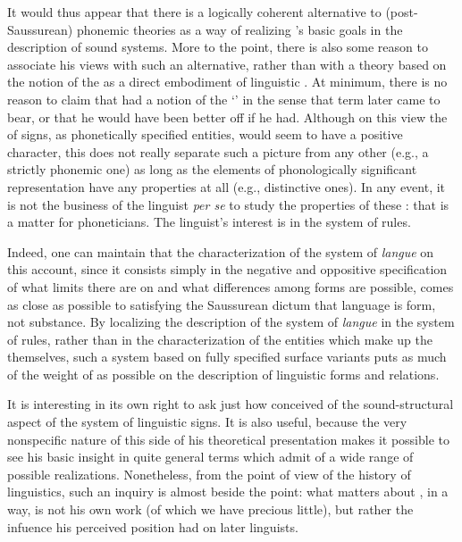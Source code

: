 It would thus appear that there is a logically coherent alternative to
(post-Saussurean) phonemic theories as a way of realizing {\Saussure}'s
basic goals in the description of sound systems. More to the point,
there is also some reason to associate his views with such an
alternative, rather than with a theory based on the notion of the
 as a direct embodiment of linguistic . At minimum,
there is no reason to claim that {\Saussure} had a notion of the
`' in the sense that term later came to bear, or that he would
have been better off if he had. Although on this view the
\emph{} of signs, as phonetically specified entities, would
seem to have a positive character, this does not really separate such
a picture from any other (e.g., a strictly phonemic one) as long as
the elements of phonologically significant representation have any
properties at all (e.g., distinctive ones). In any event, it is not
the business of the linguist \emph{per se} to study the properties of
these : that is a matter for phoneticians. The
linguist's interest is in the system of {rules}.

Indeed, one can maintain that the characterization of the system of
\emph{langue} on this account, since it consists simply in the
negative and oppositive specification of what limits there are on
 and what differences among forms are possible, comes as
close as possible to satisfying the Saussurean dictum that language is
form, not substance. By localizing the description of the system of
\emph{langue} in the system of {rules}, rather than in the
characterization of the entities which make up the \emph{}
themselves, such a system based on fully specified surface variants
puts as much of the weight of  as possible on
the description of linguistic forms and relations.

It is interesting in its own right to ask just how {\Saussure} conceived
of the sound-structural aspect of the system of linguistic signs. It
is also useful, because the very nonspecific nature of this side of
his theoretical presentation makes it possible to see his basic
insight in quite general terms which admit of a wide range of possible
realizations. Nonetheless, from the point of view of the history of
linguistics, such an inquiry is almost beside the point: what matters
about {\Saussure}, in a way, is not his own work (of which we have
precious little), but rather the infuence his perceived position had
on later linguists.

